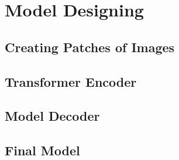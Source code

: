 \section{Model Designing}

\subsection{Creating Patches of Images}

\subsection{Transformer Encoder}

\subsection{Model Decoder}

\subsection{Final Model}
